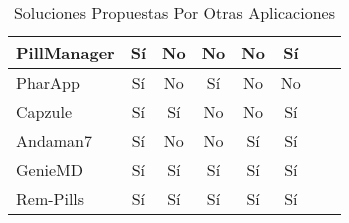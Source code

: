 \begin{table}[H]
{\begin{tabular}{|l|c|c|c|c|c|c|c|}
		PillManager                      & Sí              & No                                                                         &  No                                                                      & No                                                           &  Sí                                                                 \\ \hline
		PharApp                          & Sí              & No                                                                         &  Sí                                                                      & No                                                           &  No                                                                 \\ \hline
		Capzule                          & Sí              & Sí                                                                         &  No                                                                      & No                                                           &  Sí                                                                 \\ \hline
		Andaman7                         & Sí              & No                                                                         &  No                                                                      & Sí                                                           &  Sí                                                                 \\ \hline
		GenieMD                          & Sí              & Sí                                                                         &  Sí                                                                      & Sí                                                           &  Sí                                                                 \\ \hline
		Rem-Pills                          & Sí              & Sí                                                                         &  Sí                                                                      & Sí                                                           &  Sí                                                                 \\ \hline
	\end{tabular}
	}
\caption{Soluciones Propuestas Por Otras Aplicaciones}
\label{SolucionesProp}
\end{table}

